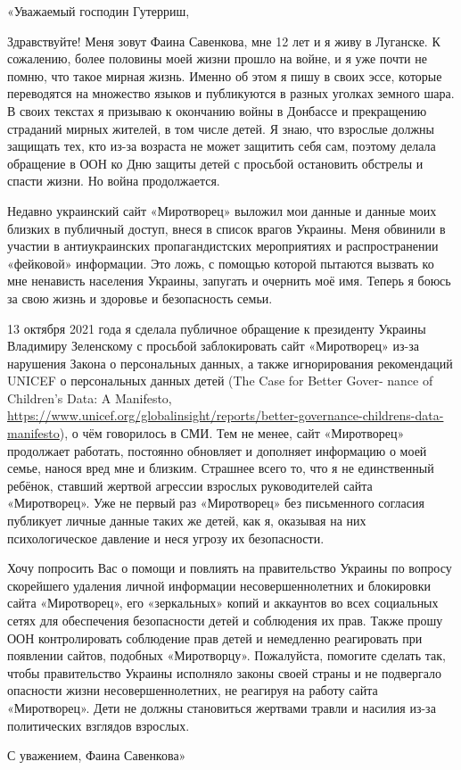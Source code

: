 \begin{zzquote}
«Уважаемый господин Гутерриш,

Здравствуйте! Меня зовут Фаина Савенкова, мне 12 лет и я живу в Луганске. К
сожалению, более половины моей жизни прошло на войне, и я уже почти не помню,
что такое мирная жизнь. Именно об этом я пишу в своих эссе, которые переводятся
на множество языков и публикуются в разных уголках земного шара. В своих
текстах я призываю к окончанию войны в Донбассе и прекращению страданий мирных
жителей, в том числе детей. Я знаю, что взрослые должны защищать тех, кто из-за
возраста не может защитить себя сам, поэтому делала обращение в ООН ко Дню
защиты детей с просьбой остановить обстрелы и спасти жизни. Но война
продолжается.

Недавно украинский сайт «Миротворец» выложил мои данные и данные моих близких в
публичный доступ, внеся в список врагов Украины. Меня обвинили в участии в
антиукраинских пропагандистских мероприятиях и распространении «фейковой»
информации. Это ложь, с помощью которой пытаются вызвать ко мне ненависть
населения Украины, запугать и очернить моё имя. Теперь я боюсь за свою жизнь и
здоровье и безопасность семьи.

13 октября 2021 года я сделала публичное обращение к президенту Украины
Владимиру Зеленскому с просьбой заблокировать сайт «Миротворец» из-за
нарушения Закона о персональных данных, а также игнорирования
рекомендаций UNICEF о персональных данных детей (The Case for Better
Gover- nance of Children’s Data: A Manifesto,
\url{https://www.unicef.org/globalinsight/reports/better-governance-childrens-data-manifesto}),
о чём говорилось в СМИ. Тем не менее, сайт «Миротворец» продолжает
работать, постоянно обновляет и дополняет информацию о моей семье,
нанося вред мне и близким. Страшнее всего то, что я не единственный
ребёнок, ставший жертвой агрессии взрослых руководителей сайта
«Миротворец». Уже не первый раз «Миротворец» без письменного согласия
публикует личные данные таких же детей, как я, оказывая на них
психологическое давление и неся угрозу их безопасности.

Хочу попросить Вас о помощи и повлиять на правительство Украины по вопросу
скорейшего удаления личной информации несовершеннолетних и блокировки сайта
«Миротворец», его «зеркальных» копий и аккаунтов во всех социальных сетях для
обеспечения безопасности детей и соблюдения их прав. Также прошу ООН
контролировать соблюдение прав детей и немедленно реагировать при появлении
сайтов, подобных «Миротворцу». Пожалуйста, помогите сделать так, чтобы
правительство Украины исполняло законы своей страны и не подвергало опасности
жизни несовершеннолетних, не реагируя на работу сайта «Миротворец». Дети не
должны становиться жертвами травли и насилия из-за политических взглядов
взрослых.

С уважением, Фаина Савенкова»
\end{zzquote}


